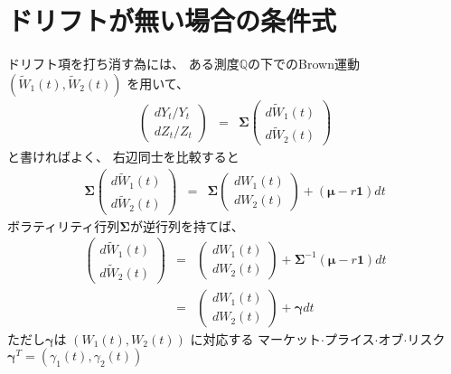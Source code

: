 \documentclass[uplatex,a4j,12pt,dvipdfmx]{jsarticle}
\begin{document}
\section{ドリフトが無い場合の条件式}
ドリフト項を打ち消す為には、
ある測度$\mathbb{Q}$の下でのBrown運動
$(\tilde{W}_{1}(t),\tilde{W}_{2}(t))$
を用いて、
%
%
\begin{eqnarray}
	\left(
	\begin{array}{c}
			d Y_{t} / Y_{t}
			\\
			d Z_{t} / Z_{t}
		\end{array}
	\right)
	&=&
	{\bm \Sigma}
	\left(
	\begin{array}{c}
			d \tilde{W}_{1}(t)
			\\
			d \tilde{W}_{2}(t)
		\end{array}
	\right)
\end{eqnarray}
%
%
と書ければよく、
右辺同士を比較すると
%
%
\begin{eqnarray}
	{\bm \Sigma}
	\left(
	\begin{array}{c}
			d \tilde{W}_{1}(t)
			\\
			d \tilde{W}_{2}(t)
		\end{array}
	\right)
	&=&
	{\bm \Sigma}
	\left(
	\begin{array}{c}
			dW_{1}(t)
			\\
			dW_{2}(t)
		\end{array}
	\right)
	+
	( {\bm \mu} - r {\bm 1} ) dt
\end{eqnarray}
%
%
ボラティリティ行列${\bm \Sigma}$が逆行列を持てば、
%
%
\begin{eqnarray}
	\left(
	\begin{array}{c}
			d \tilde{W}_{1}(t)
			\\
			d \tilde{W}_{2}(t)
		\end{array}
	\right)
	&=&
	\left(
	\begin{array}{c}
			dW_{1}(t)
			\\
			dW_{2}(t)
		\end{array}
	\right)
	+
	{\bm \Sigma}^{-1}
	( {\bm \mu} - r {\bm 1} ) dt
	\\ &=&
	\left(
	\begin{array}{c}
			dW_{1}(t)
			\\
			dW_{2}(t)
		\end{array}
	\right)
	+
	{\bm \gamma}dt
\end{eqnarray}
%
%
ただし${\bm \gamma}$は
$(W_{1}(t),W_{2}(t))$
に対応する
マーケット$\cdot$プライス$\cdot$オブ$\cdot$リスク
${\bm \gamma}^{T} = (\gamma_{1}(t),\gamma_{2}(t))$
\end{document}
